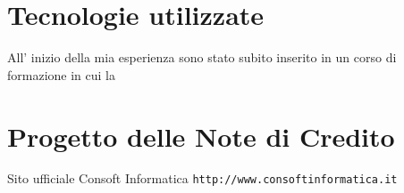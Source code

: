 \documentclass[12pt,a4paper,twoside,openright]{toptesi}
\begin{document}
\chapter{Tecnologie utilizzate}
All' inizio della mia esperienza sono stato subito inserito in un corso di 
formazione in cui la 
\chapter{Progetto delle Note di Credito}
\begin{thebibliography}{9}
     Sito ufficiale Consoft Informatica \newline
    \texttt{http://www.consoftinformatica.it}
\end{thebibliography}
\end{document}
